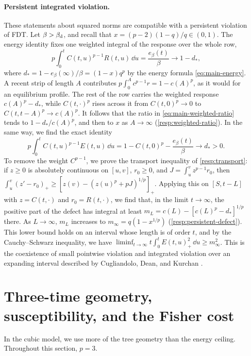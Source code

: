 \paragraph{Persistent integrated violation.}
These statements about squared norms are compatible with a persistent violation of FDT. Let $\beta>\beta_{\mathrm d}$, and recall that $x=(p-2)(1-q)/q\in(0,1)$. The energy identity fixes one weighted integral of the response over the whole row,
\[
 p\int_0^tC(t,u)^{p-1}R(t,u)\,\dd u=\frac{e_\beta(t)}\beta\longrightarrow1-d_*,
\]
where $d_*=1-e_\beta(\infty)/\beta=(1-x)q^p$ by the energy formula \eqref{eq:main-energy}. A recent strip of length $A$ contributes $p\int_0^Ac^{p-1}r=1-c(A)^p$, as it would for an equilibrium profile. The rest of the row carries the weighted response $c(A)^p-d_*$, while $C(t,\cdot)^p$ rises across it from $C(t,0)^p\to0$ to $C(t,t-A)^p\to c(A)^p$. It follows that the ratio in \eqref{eq:main-weighted-ratio} tends to $1-d_*/c(A)^p$, and then to $x$ as $A\to\infty$ (\cref{resp:weighted-ratio}). In the same way, we find the exact identity
\[
 p\int_0^tC(t,u)^{p-1}E(t,u)\,\dd u=1-C(t,0)^p-\frac{e_\beta(t)}\beta\longrightarrow d_*>0 .
\]
To remove the weight $C^{p-1}$, we prove the transport inequality of \cref{resp:transport}: if $z\ge0$ is absolutely continuous on $[u,v]$, $r_0\ge0$, and $J=\int_u^vz^{p-1}r_0$, then $\int_u^v(z'-r_0)_+\ge[z(v)-(z(u)^p+pJ)^{1/p}]_+$. Applying this on $[S,t-L]$ with $z=C(t,\cdot)$ and $r_0=R(t,\cdot)$, we find that, in the limit $t\to\infty$, the positive part of the defect has integral at least $m_L=c(L)-[c(L)^p-d_*]^{1/p}$ there. As $L\to\infty$, $m_L$ increases to $m_\infty=q(1-x^{1/p})$ (\cref{resp:persistent-defect}). This lower bound holds on an interval whose length is of order $t$, and by the Cauchy--Schwarz inequality, we have $\liminf_{t\to\infty}t\int_0^tE(t,u)_+^2\,\dd u\ge m_\infty^2$. This is the coexistence of small pointwise violation and integrated violation over an expanding interval described by Cugliandolo, Dean, and Kurchan \cite{cdk1997}.

\section{Three-time geometry, susceptibility, and the Fisher cost}\label{sec:overview-geometry}

In the cubic model, we use more of the tree geometry than the energy ceiling. Throughout this section, $p=3$.

